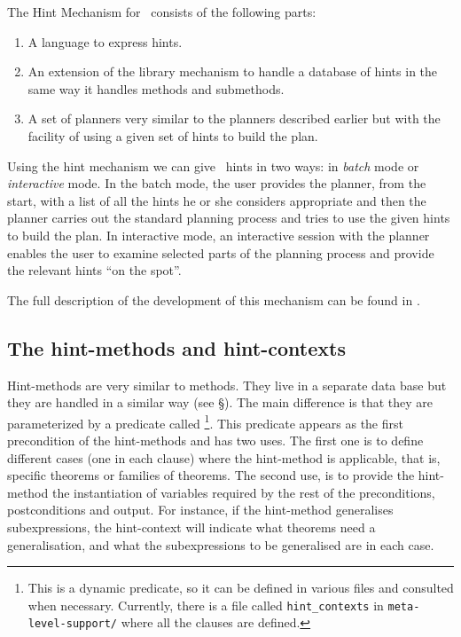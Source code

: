         The Hint Mechanism for \clam\ consists of the following parts:

\begin{enumerate}

\item A language to express hints.

\item An extension of the library mechanism to handle a database of
hints in the same way it handles methods and submethods.

\item A set of planners very similar to the planners described earlier
but with the facility of using a given set of hints to build the plan.

\end{enumerate}

        Using the hint mechanism we can give \clam\ hints in two ways: in
{\em batch\/} mode or {\em interactive\/} mode. In the batch mode, the user
provides the planner, from the start, with a list of all the hints he or
she considers appropriate and then the planner carries out the standard
planning process and tries to use the given hints to build the plan. In
interactive mode, an interactive session with the planner enables the
user to examine selected parts of the planning process and provide the
relevant hints ``on the spot''.

        The full description of the development of this mechanism can be
found in \cite{negrete-msc}.

\subsection {The hint-methods and hint-contexts}
\label{hint-methods}

        Hint-methods are very similar to methods. They live in a
separate data base but they are handled in a similar way (see \S{}).  The main difference is that they are parameterized
by a predicate called \footnote{This is a dynamic
predicate, so it can be defined in various files and consulted when
necessary. Currently, there is a file called {\tt hint\_contexts} in
{\tt meta-level-support/} where all the
 clauses are defined.}.  This predicate appears as the
first precondition of the hint-methods and has two uses. The first one
is to define different cases (one in each clause) where the
hint-method is applicable, that is, specific theorems or families of
theorems. The second use, is to provide the hint-method the
instantiation of variables required by the rest of the preconditions,
postconditions and output. For instance, if the hint-method
generalises subexpressions, the hint-context will indicate what
theorems need a generalisation, and what the subexpressions to be
generalised are in each case.

